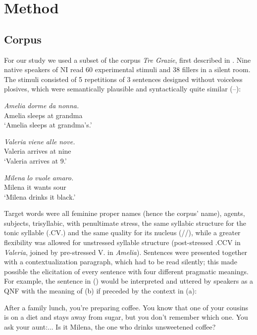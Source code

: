 \section{Method}\label{sec22}
\subsection{Corpus}\label{sec221}
For our study we used a subset of the corpus \textit{Tre Grazie}, first described in \citet{dimperio2008phonetics}. Nine native speakers of NI read 60 experimental stimuli and 38 fillers in a silent room. The stimuli consisted of 5 repetitions of 3 sentences designed without voiceless plosives, which were semantically plausible and syntactically quite similar (--):

\ea
\gll \textit{Amelia} \textit{dorme} \textit{da} \textit{nonna.}\\
Amelia sleeps at grandma\\
\glt ‘Amelia sleeps at grandma's.’
\z

\ea
\gll \textit{Valeria} \textit{viene} \textit{alle} \textit{nove.}\\
Valeria arrives at nine\\
\glt ‘Valeria arrives at 9.’
\z

\ea
\gll \textit{Milena} \textit{lo} \textit{vuole} \textit{amaro.}\\
Milena it wants sour\\
\glt ‘Milena drinks it black.’
\z

Target words were all feminine proper names (hence the corpus' name), agents, subjects, trisyllabic, with penultimate stress, the same syllabic structure for the tonic syllable (.CV.) and the same quality for its nucleus (//), while a greater flexibility was allowed for unstressed syllable structure (post-stressed .CCV in \textit{Valeria}, joined by pre-stressed V. in \textit{Amelia}). Sentences were presented together with a contextualization paragraph, which had to be read silently; this made possible the elicitation of every sentence with four different pragmatic meanings. For example, the sentence in () would be interpreted and uttered by speakers as a QNF with the meaning of (b) if preceded by the context in (a):

\eal
\ex After a family lunch, you’re preparing coffee. You know that one of your cousins is on a diet and stays away from sugar, but you don’t remember which one. You ask your aunt:...
\ex Is it Milena, the one who drinks unsweetened coffee?
\zl

